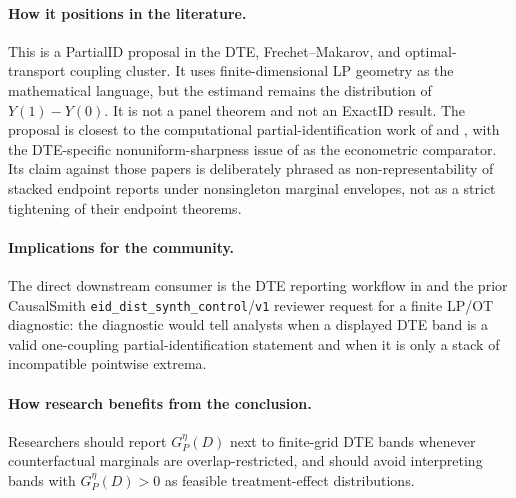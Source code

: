 \documentclass[11pt]{article}
\theoremstyle{definition}
\theoremstyle{plain}
\theoremstyle{remark}
\begin{document}
\paragraph{How it positions in the literature.}
This is a PartialID proposal in the DTE, Frechet--Makarov, and optimal-transport
coupling cluster.  It uses finite-dimensional LP geometry as the mathematical
language, but the estimand remains the distribution of \(Y(1)-Y(0)\).  It is not
a panel theorem and not an ExactID result.  The proposal is closest to the
computational partial-identification work of \citet{Russell2021} and
\citet{OberReynolds2023}, with the DTE-specific nonuniform-sharpness issue of
\citet{FirpoRidder2019} as the econometric comparator.  Its claim against those
papers is deliberately phrased as non-representability of stacked endpoint
reports under nonsingleton marginal envelopes, not as a strict tightening of
their endpoint theorems.

\paragraph{Implications for the community.}
The direct downstream consumer is the DTE reporting workflow in
\citet{FanPark2010} and the prior CausalSmith
\texttt{eid\_dist\_synth\_control}/\texttt{v1} reviewer request for a finite
LP/OT diagnostic: the diagnostic would tell analysts when a displayed DTE band is
a valid one-coupling partial-identification statement and when it is only a stack
of incompatible pointwise extrema.

\paragraph{How research benefits from the conclusion.}
Researchers should report \(G^\eta_P(D)\) next to finite-grid DTE bands whenever
counterfactual marginals are overlap-restricted, and should avoid interpreting
bands with \(G^\eta_P(D)>0\) as feasible treatment-effect distributions.
\end{document}
